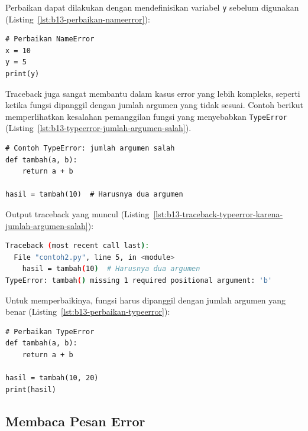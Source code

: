 Perbaikan dapat dilakukan dengan mendefinisikan variabel \texttt{y} sebelum digunakan (Listing~\ref{lst:b13-perbaikan-nameerror}):

\begin{lstlisting}[style=PythonStyle, caption={Perbaikan NameError}, label={lst:b13-perbaikan-nameerror}]
# Perbaikan NameError
x = 10
y = 5
print(y)
\end{lstlisting}

Traceback juga sangat membantu dalam kasus error yang lebih kompleks, seperti ketika fungsi dipanggil dengan jumlah argumen yang tidak sesuai. Contoh berikut memperlihatkan kesalahan pemanggilan fungsi yang menyebabkan \texttt{TypeError} (Listing~\ref{lst:b13-typeerror-jumlah-argumen-salah}).

\begin{lstlisting}[style=PythonStyle, caption={Contoh TypeError: jumlah argumen salah}, label={lst:b13-typeerror-jumlah-argumen-salah}]
# Contoh TypeError: jumlah argumen salah
def tambah(a, b):
    return a + b

hasil = tambah(10)  # Harusnya dua argumen
\end{lstlisting}

Output traceback yang muncul (Listing~\ref{lst:b13-traceback-typeerror-karena-jumlah-argumen-salah}):

\begin{lstlisting}[language=bash, caption={Traceback untuk TypeError karena jumlah argumen salah}, label={lst:b13-traceback-typeerror-karena-jumlah-argumen-salah}]
Traceback (most recent call last):
  File "contoh2.py", line 5, in <module>
    hasil = tambah(10)  # Harusnya dua argumen
TypeError: tambah() missing 1 required positional argument: 'b'
\end{lstlisting}

Untuk memperbaikinya, fungsi harus dipanggil dengan jumlah argumen yang benar (Listing~\ref{lst:b13-perbaikan-typeerror}):

\begin{lstlisting}[style=PythonStyle, caption={Perbaikan TypeError}, label={lst:b13-perbaikan-typeerror}]
# Perbaikan TypeError
def tambah(a, b):
    return a + b

hasil = tambah(10, 20)
print(hasil)
\end{lstlisting}

\subsection{Membaca Pesan Error}

